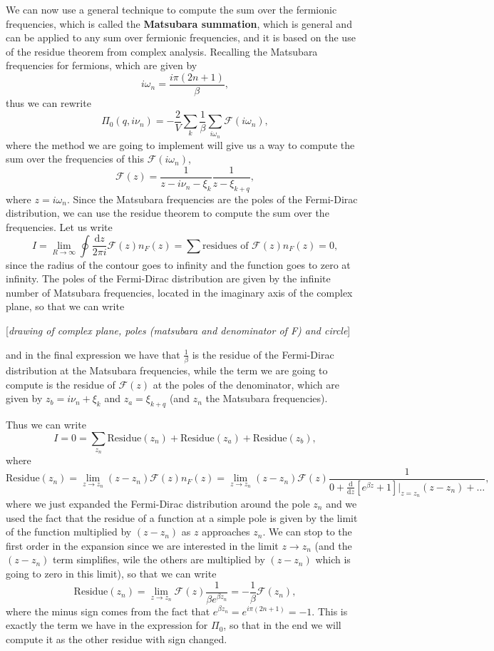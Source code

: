 We can now use a general technique to compute the sum over the fermionic frequencies, which is called the \textbf{Matsubara summation}, which is general and can be applied to any sum over fermionic frequencies, and it is based on the use of the residue theorem from complex analysis. Recalling the Matsubara frequencies for fermions, which are given by
\[
    i \omega_n = \frac{i \pi(2n + 1)}{\beta},
\]
thus we can rewrite
\[
    \Pi_0(q, i \nu_n) = - \frac{2}{V} \sum_{k} \frac{1}{\beta} \sum_{i \omega_n} \mathcal{F} (i \omega_n),
\]
where the method we are going to implement will give us a way to compute the sum over the frequencies of this \(\mathcal{F}(i \omega_n)\),
\[
    \mathcal{F}(z) = \frac{1}{z - i \nu_n - \xi_k} \frac{1}{z - \xi_{k+q}},
\]
where \(z = i \omega_n\). Since the Matsubara frequencies are the poles of the Fermi-Dirac distribution, we can use the residue theorem to compute the sum over the frequencies. Let us write
\[
    I = \lim_{R \to \infty} \oint \frac{\mathrm{d}z}{2 \pi i} \mathcal{F} (z) n_F(z) = \sum \text{residues of } \mathcal{F}(z) n_F(z) = 0,
\]
since the radius of the contour goes to infinity and the function goes to zero at infinity. The poles of the Fermi-Dirac distribution are given by the infinite number of Matsubara frequencies, located in the imaginary axis of the complex plane, so that we can write

    [\textit{drawing of complex plane, poles (matsubara and denominator of F) and circle}]

and in the final expression we have that \(\frac{1}{\beta}\) is the residue of the Fermi-Dirac distribution at the Matsubara frequencies, while the term we are going to compute is the residue of \(\mathcal{F}(z)\) at the poles of the denominator, which are given by \(z_b = i \nu_n + \xi_k\) and \(z_a = \xi_{k+q}\) (and \(z_n\) the Matsubara frequencies).

Thus we can write
\[
    I = 0 = \sum_{z_n} \text{Residue}(z_n) + \text{Residue}(z_a) + \text{Residue}(z_b),
\]
where
\[
    \text{Residue}(z_n) = \lim_{z \to z_n} (z - z_n) \mathcal{F}(z) n_F(z) = \lim_{z \to z_n} (z-z_n) \mathcal{F}(z) \frac{1}{0 + \frac{\mathrm{d}}{\mathrm{d}z}[e^{\beta z} + 1]\bigg|_{z=z_n} (z-z_n) + \dots},
\]
where we just expanded the Fermi-Dirac distribution around the pole \(z_n\) and we used the fact that the residue of a function at a simple pole is given by the limit of the function multiplied by \((z-z_n)\) as \(z\) approaches \(z_n\). We can stop to the first order in the expansion since we are interested in the limit \(z \to z_n\) (and the \((z-z_n)\) term simplifies, wile the others are multiplied by \((z-z_n)\) which is going to zero in this limit), so that we can write
\[
    \text{Residue}(z_n) = \lim_{z \to z_n} \mathcal{F}(z) \frac{1}{\beta e^{\beta z_n}} = - \frac{1}{\beta} \mathcal{F}(z_n),
\]
where the minus sign comes from the fact that \(e^{\beta z_n} = e^{i \pi (2n + 1)} = -1\). This is exactly the term we have in the expression for \(\Pi_0\), so that in the end we will compute it as the other residue with sign changed.

